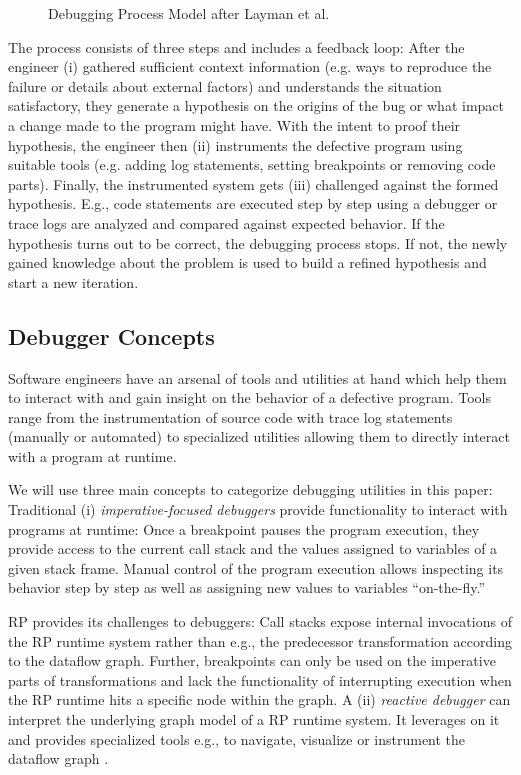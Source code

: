 \documentclass[12pt,a4paper]{article}
\begin{document}
\begin{figure}[H]
	\centering
	\caption{Debugging Process Model after Layman et al. \cite{Layman_Diep_Nagappan_Singer_Deline_Venolia_2013}}
	\label{fig:debugging-process-model}
\end{figure}

The process consists of three steps and includes a feedback loop: After the engineer (i) gathered sufficient context information (e.g. ways to reproduce the failure or details about external factors) and understands the situation satisfactory, they generate a hypothesis on the origins of the bug or what impact a change made to the program might have. With the intent to proof their hypothesis, the engineer then (ii) instruments the defective program using suitable tools (e.g. adding log statements, setting breakpoints or removing code parts). Finally, the instrumented system gets (iii) challenged against the formed hypothesis. E.g., code statements are executed step by step using a debugger or trace logs are analyzed and compared against expected behavior. If the hypothesis turns out to be correct, the debugging process stops. If not, the newly gained knowledge about the problem is used to build a refined hypothesis and start a new iteration.

\subsection{Debugger Concepts}

Software engineers have an arsenal of tools and utilities at hand which help them to interact with and gain insight on the behavior of a defective program. Tools range from the instrumentation of source code with trace log statements (manually or automated) to specialized utilities allowing them to directly interact with a program at runtime.

We will use three main concepts to categorize debugging utilities in this paper: Traditional (i) \emph{imperative-focused debuggers} provide functionality to interact with programs at runtime: Once a breakpoint pauses the program execution, they provide access to the current call stack and the values assigned to variables of a given stack frame. Manual control of the program execution allows inspecting its behavior step by step as well as assigning new values to variables ``on-the-fly.''

RP provides its challenges to debuggers: Call stacks expose internal invocations of the RP runtime system rather than e.g., the predecessor transformation according to the dataflow graph. Further, breakpoints can only be used on the imperative parts of transformations and lack the functionality of interrupting execution when the RP runtime hits a specific node within the graph. A (ii) \emph{reactive debugger} can interpret the underlying graph model of a RP runtime system. It leverages on it and provides specialized tools e.g., to navigate, visualize or instrument the dataflow graph \cite{10.1145/2884781.2884815} \cite{10.1145/3180155.3180156} \cite{rxviz}.
\end{document}
